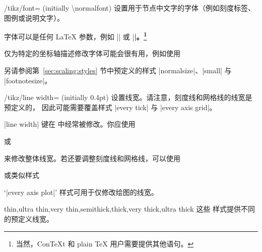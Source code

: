 \begin{key}{/tikz/font= (initially \textbackslash normalfont)}
    设置用于节点中文字的字体（例如刻度标签、
    图例或说明文字）。

    字体可以是任何 \LaTeX{} 参数，例如 |\footnotesize| 或
    |\small\bfseries|。\footnote{当然，Con\TeX{}t 和 plain \TeX{} 用户需要提供其他语句。}

    仅为特定的坐标轴描述修改字体可能会很有用，例如使用
\begin{codeexample}
\end{codeexample}

    另请参阅第~\ref{sec:scaling:styles} 节中预定义的样式
    |normalsize|、|small| 与 |footnotesize|。
\end{key}

\begin{key}{/tikz/line width= (initially 0.4pt)}
    设置线宽。请注意，刻度线和网格线的线宽是预定义的，
    因此可能需要覆盖样式 |every tick| 与 |every axis grid|。

    |line width| 键在 \Tikz{} 中经常被修改。你应使用
\begin{codeexample}
\end{codeexample}
    或
\begin{codeexample}
\end{codeexample}
    来修改整体线宽。若还要调整刻度线和网格线，可以使用
\begin{codeexample}
\end{codeexample}
    或类似样式
\begin{codeexample}
\end{codeexample}
    `|every axis plot|' 样式可用于仅修改绘图的线宽。
\end{key}

\begin{keylist}[/tikz]{thin,ultra thin,very thin,semithick,thick,very thick,ultra thick}
    这些 \Tikz{} 样式提供不同的预定义线宽。
\end{keylist}

